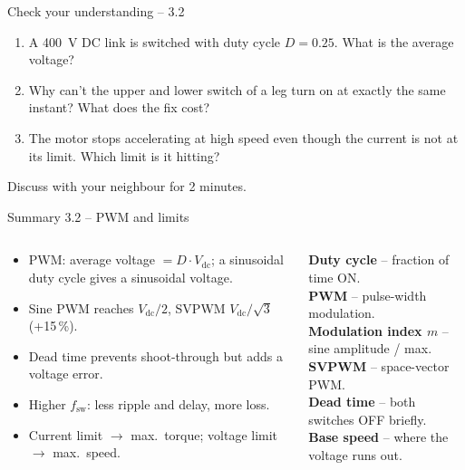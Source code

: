 \documentclass[aspectratio=169,10pt]{beamer}
\begin{document}
\begin{frame}[t]{Check your understanding -- 3.2}
\vspace{4mm}
\begin{keybox}
\large
\begin{enumerate}
\item A \SI{400}{V} DC link is switched with duty cycle $D=0.25$. What is the average voltage?\\[3mm]
\item Why can't the upper and lower switch of a leg turn on at exactly the same instant? What does the fix cost?\\[3mm]
\item The motor stops accelerating at high speed even though the current is not at its limit. Which limit is it hitting?
\end{enumerate}
\end{keybox}
\vfill
\centering\small\color{mkGray} Discuss with your neighbour for 2 minutes.
\end{frame}

\begin{frame}{Summary 3.2 -- PWM and limits}
\begin{columns}[T,onlytextwidth]
\begin{keybox}
\small
\begin{itemize}
\item PWM: average voltage $=D\cdot V_\text{dc}$; a sinusoidal duty cycle gives a sinusoidal voltage.
\item Sine PWM reaches $V_\text{dc}/2$, SVPWM $V_\text{dc}/\sqrt3$ (+15\,\%).
\item Dead time prevents shoot-through but adds a voltage error.
\item Higher $f_\text{sw}$: less ripple and delay, more loss.
\item Current limit $\to$ max.\ torque; voltage limit $\to$ max.\ speed.
\end{itemize}
\end{keybox}
\begin{defbox}
\small
\textbf{Duty cycle} -- fraction of time ON.\\
\textbf{PWM} -- pulse-width modulation.\\
\textbf{Modulation index $m$} -- sine amplitude / max.\\
\textbf{SVPWM} -- space-vector PWM.\\
\textbf{Dead time} -- both switches OFF briefly.\\
\textbf{Base speed} -- where the voltage runs out.
\end{defbox}
\end{columns}
\end{frame}
\end{document}
